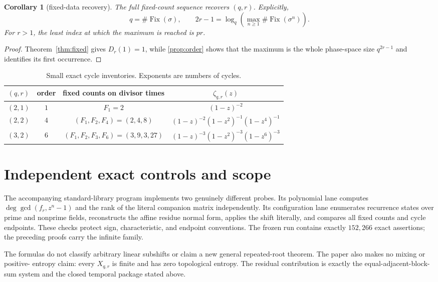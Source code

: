\documentclass[11pt,a4paper]{amsart}
\newtheorem{corollary}[theorem]{Corollary}
\theoremstyle{definition}
\theoremstyle{remark}
\newcommand{\Fix}{\operatorname{Fix}}
\begin{document}
\begin{corollary}[fixed-data recovery]\label{cor:recovery}
The full fixed-count sequence recovers $(q,r)$.  Explicitly,
\[
 q=\#\Fix(\sigma),\qquad
 2r-1=\log_q\left(\max_{n\geq1}\#\Fix(\sigma^n)\right).
\]
For $r>1$, the least index at which the maximum is reached is $pr$.
\end{corollary}

\begin{proof}
Theorem~\ref{thm:fixed} gives $D_r(1)=1$, while
\cref{prop:order} shows that the maximum is the whole phase-space size
$q^{2r-1}$ and identifies its first occurrence.
\end{proof}

\begin{table}[t]
\centering
\caption{Small exact cycle inventories.  Exponents are numbers of cycles.}
\begin{tabular}{cccc}
\toprule
$(q,r)$ & order & fixed counts on divisor times & $\zeta_{q,r}(z)$ \\
\midrule
$(2,1)$ & $1$ & $F_1=2$ & $(1-z)^{-2}$ \\
$(2,2)$ & $4$ & $(F_1,F_2,F_4)=(2,4,8)$
 & $(1-z)^{-2}(1-z^2)^{-1}(1-z^4)^{-1}$ \\
$(3,2)$ & $6$ & $(F_1,F_2,F_3,F_6)=(3,9,3,27)$
 & $(1-z)^{-3}(1-z^2)^{-3}(1-z^6)^{-3}$ \\
\bottomrule
\end{tabular}
\end{table}

\section{Independent exact controls and scope}

The accompanying standard-library program implements two genuinely
different probes.  Its polynomial lane computes $\deg\gcd(f_r,z^n-1)$ and
the rank of the literal companion matrix independently.  Its configuration
lane enumerates recurrence states over prime and nonprime fields, reconstructs
the affine residue normal form, applies the shift literally, and compares all
fixed counts and cycle endpoints.  These checks protect sign, characteristic,
and endpoint conventions.  The frozen run contains exactly
$152{,}266$ exact assertions; the preceding proofs carry the infinite family.

The formulas do not classify arbitrary linear subshifts or claim a new
general repeated-root theorem.  The paper also makes no mixing or positive-
entropy claim: every $X_{q,r}$ is finite and has zero topological entropy.
The residual contribution is exactly the equal-adjacent-block-sum system and
the closed temporal package stated above.



\end{document}
